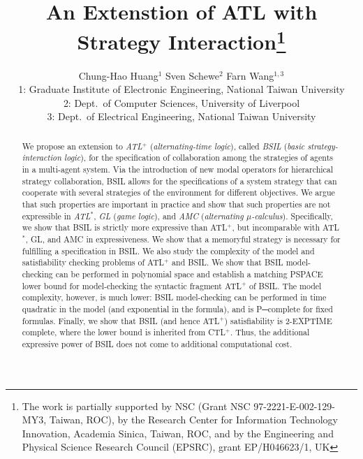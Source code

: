 \documentclass[11pt]{article}
\begin{document}
\title{An Extenstion of ATL with Strategy Interaction\thanks{
The work is partially supported by NSC (Grant NSC 97-2221-E-002-129-MY3, Taiwan, ROC),
by the Research Center for Information Technology Innovation, Academia Sinica,
Taiwan, ROC, and by the
Engineering and Physical Science Research Council (EPSRC), grant EP/H046623/1, UK}  
}

\author{Chung-Hao Huang$^{1}$ \hspace*{5mm} 
Sven Schewe{$^2$} \hspace*{5mm} 
Farn Wang$^{1,3}$ 
\\[5mm] 
1: Graduate Institute of Electronic Engineering, National Taiwan University\\
2: Dept.\ of Computer Sciences, University of Liverpool\\
3: Dept.\ of Electrical Engineering, National Taiwan University 
}


\maketitle
\thispagestyle{empty}
\pagestyle{plain}
\baselineskip 18pt

\begin{abstract}
We propose an extension to {\em ATL$^+$} ({\em alternating-time logic}), 
called {\em BSIL} ({\em basic strategy-interaction logic}), 
for the specification of collaboration among the strategies of agents in a multi-agent system.  
Via the introduction of new modal operators for hierarchical strategy collaboration, 
BSIL allows for the specifications of a system strategy 
that can cooperate with several strategies of the environment for different objectives.  
We argue that such properties are important in practice 
and show that such properties are not expressible in 
{\em ATL$^*$}, 
{\em GL} ({\em game logic}), and 
{\em AMC} ({\em alternating $\mu$-calculus}). 
Specifically, we show that BSIL is strictly more expressive than ATL$^+$, 
but incomparable with ATL$^*$, GL, and AMC in expressiveness.  
We show that a memoryful strategy is
necessary for fulfilling a specification in BSIL.  
%
We also study the complexity of the model and satisfiability checking problems 
of ATL$^+$ and BSIL.
We show that BSIL model-checking can be performed in polynomial space and establish a matching PSPACE lower bound for model-checking the syntactic fragment ATL$^+$ of BSIL.
The model complexity, however, is much lower: BSIL model-checking can be performed in time quadratic in the model (and exponential in the formula), and is P─complete for fixed formulas.
Finally, we show that BSIL (and hence ATL$^+$) satisfiability is 2-EXPTIME complete, where the lower bound is inherited from CTL$^+$.
Thus, the additional expressive power of BSIL does not come to additional computational cost.
\end{abstract}
\end{document}

